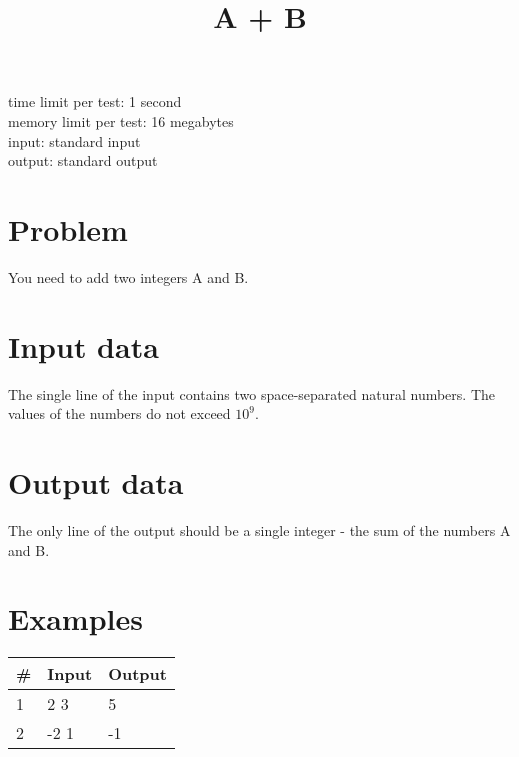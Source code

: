 \documentclass[a4paper]{article}
\title{A + B}
\date{\vspace{-10ex}}
\begin{document}
\maketitle
\begin{center} 
    time limit per test: 1 second \\
    memory limit per test: 16 megabytes \\
    input: standard input \\
    output: standard output
\end{center}


\section*{Problem}
You need to add two integers A and B.
\section*{Input data}
The single line of the input contains two space-separated natural numbers. The values of the numbers do not exceed $10^9$.
\section*{Output data}
The only line of the output should be a single integer - the sum of the numbers A and B.
\section*{Examples}
\begin{center}
\begin{tabular}{ |p{0.3cm}|p{7cm}|p{7cm}| }
    \hline
    \# & Input & Output\\
    \hline
    1& 2 3 & 5\\
    \hline
    2 & -2 1  & -1\\
    \hline
\end{tabular}
\end{center}
\end{document}

